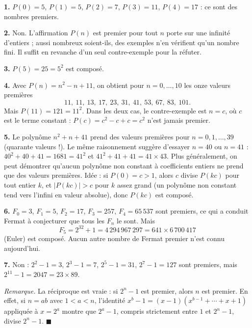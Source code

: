 \textbf{1.} $P(0) = 5$, $P(1) = 5$, $P(2) = 7$, $P(3) = 11$, $P(4) = 17$ : ce
sont des nombres premiers.

\textbf{2.} Non. L'affirmation \og $P(n)$ est premier pour tout $n$ \fg{} porte
sur une infinité d'entiers ; aussi nombreux soient-ils, des exemples n'en
vérifient qu'un nombre fini. Il suffit en revanche d'un seul contre-exemple
pour la réfuter.

\textbf{3.} $P(5) = 25 = 5^2$ est composé.

\textbf{4.} Avec $P(n) = n^2 - n + 11$, on obtient pour $n = 0, \ldots, 10$
les onze valeurs premières
\[
11,\ 11,\ 13,\ 17,\ 23,\ 31,\ 41,\ 53,\ 67,\ 83,\ 101 .
\]
Mais
$P(11) = 121 = 11^2$. Dans les deux cas, le contre-exemple est $n = c$, où
$c$ est le terme constant : $P(c) = c^2 - c + c = c^2$ n'est jamais premier.

\textbf{5.} Le polynôme $n^2 + n + 41$ prend des valeurs premières pour
$n = 0, 1, \ldots, 39$ (quarante valeurs !). Le même raisonnement suggère
d'essayer $n = 40$ ou $n = 41$ : $40^2 + 40 + 41 = 1681 = 41^2$ et
$41^2 + 41 + 41 = 41 \times 43$. Plus généralement, on peut démontrer
qu'aucun polynôme non constant à coefficients entiers ne prend que des
valeurs premières. Idée : si $P(0) = c > 1$, alors $c$ divise $P(kc)$ pour
tout entier $k$, et $|P(kc)| > c$ pour $k$ assez grand (un polynôme non
constant tend vers l'infini en valeur absolue), donc $P(kc)$ est composé.

\textbf{6.} $F_0 = 3$, $F_1 = 5$, $F_2 = 17$, $F_3 = 257$, $F_4 = 65\,537$
sont premiers, ce qui a conduit Fermat à conjecturer que tous les $F_n$ le
sont. Mais
\[
F_5 = 2^{32} + 1 = 4\,294\,967\,297 = 641 \times 6\,700\,417
\]
(Euler) est composé. Aucun autre nombre de Fermat premier n'est connu
aujourd'hui.

\textbf{7.} Non : $2^2 - 1 = 3$, $2^3 - 1 = 7$, $2^5 - 1 = 31$,
$2^7 - 1 = 127$ sont premiers, mais $2^{11} - 1 = 2047 = 23 \times 89$.

\emph{Remarque.} La réciproque est vraie : si $2^n - 1$ est premier, alors
$n$ est premier. En effet, si $n = ab$ avec $1 < a < n$, l'identité
$x^b - 1 = (x - 1)(x^{b-1} + \cdots + x + 1)$ appliquée à $x = 2^a$ montre que
$2^a - 1$, compris strictement entre $1$ et $2^n - 1$, divise $2^n - 1$.
\hfill $\blacksquare$

